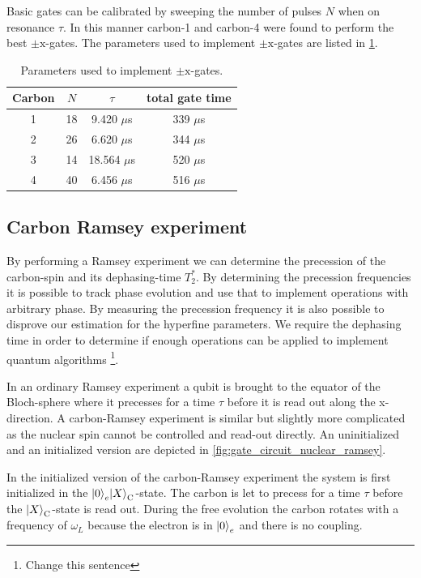 Basic gates can be calibrated by sweeping the number of pulses $N$ when on resonance $\tau$.
In this manner carbon-1 and carbon-4 were found to perform the best $\pm\mathrm{x}$-gates.
The parameters used to implement $\pm\mathrm{x}$-gates are listed in \cref{tbl:gate_parameters}.

\begin{table}[htbp]
    \centering
    \begin{tabular}{cccc}
    Carbon &  $ N $ &  $\tau$ & total gate time\\ \hline
    1 &  18 & { }9.420 $\mu$s & 339 $\mu$s \\
    2 & 26 & { }6.620 $\mu$s & 344 $\mu$s \\
    3 & 14 & 18.564 $\mu$s & 520 $\mu$s \\
    4 &  40 & { }6.456 $\mu$s & 516 $\mu$s
    \end{tabular}
    \caption{Parameters used to implement $\pm\mathrm{x}$-gates.}
    \label{tbl:gate_parameters}
\end{table}



\subsection{Carbon Ramsey experiment }
By performing a Ramsey experiment we can determine the precession of the carbon-spin and its dephasing-time $T_2^*$.
By determining the precession frequencies it is possible to track phase evolution and use that to implement operations with arbitrary phase.
By measuring the precession frequency it is also possible to disprove our estimation for the hyperfine parameters.
We require the dephasing time in order to determine if enough operations can be applied to implement quantum algorithms \footnote{Change this sentence}.

In an ordinary Ramsey experiment a qubit is brought to the equator of the Bloch-sphere where it precesses for a time $\tau $ before it is read out along the x-direction.
A carbon-Ramsey experiment is similar but slightly more complicated as the nuclear spin cannot be controlled and read-out directly.
An uninitialized and an initialized version are depicted in \cref{fig:gate_circuit_nuclear_ramsey}.

In the initialized version of the carbon-Ramsey experiment the system is first initialized in the ${\left\vert{0}\right\rangle}_e{\left\vert{X}\right\rangle}_\mathrm{C}$-state.
The carbon is let to precess for a time $\tau$ before the ${\left\vert{X}\right\rangle}_\mathrm{C}$-state is read out.
During the free evolution the carbon rotates with a frequency of $\omega_L$ because the electron is in ${\left\vert{0}\right\rangle}_e$ and there is no coupling.

